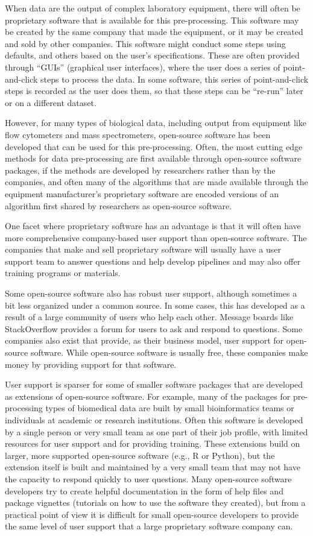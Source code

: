\documentclass[]{tufte-book}
\begin{document}
When data are the output of complex laboratory equipment, there will often be
proprietary software that is available for this pre-processing. This software
may be created by the same company that made the equipment, or it may be created
and sold by other companies. This software might conduct some steps using
defaults, and others based on the user's specifications. These are often
provided through ``GUIs'' (graphical user interfaces), where the user does a
series of point-and-click steps to process the data. In some software, this
series of point-and-click steps is recorded as the user does them, so that these
steps can be ``re-run'' later or on a different dataset.

However, for many types of biological data, including output from equipment like
flow cytometers and mass spectrometers, open-source software has been developed
that can be used for this pre-processing. Often, the most cutting edge methods
for data pre-processing are first available through open-source software
packages, if the methods are developed by researchers rather than by the
companies, and often many of the algorithms that are made available through the
equipment manufacturer's proprietary software are encoded versions of an
algorithm first shared by researchers as open-source software.

One facet where proprietary software has an advantage is that it will often have
more comprehensive company-based user support than open-source software. The
companies that make and sell proprietary software will usually have a user
support team to answer questions and help develop pipelines and may also offer
training programs or materials.

Some open-source software also has robust user support, although sometimes a bit
less organized under a common source. In some cases, this has developed as a
result of a large community of users who help each other. Message boards like
StackOverflow provides a forum for users to ask and respond to questions. Some
companies also exist that provide, as their business model, user support for
open-source software. While open-source software is usually free, these
companies make money by providing support for that software.

User support is sparser for some of smaller software packages that are developed
as extensions of open-source software. For example, many of the packages for
pre-processing types of biomedical data are built by small bioinformatics teams
or individuals at academic or research institutions. Often this software is
developed by a single person or very small team as one part of their job
profile, with limited resources for user support and for providing training.
These extensions build on larger, more supported open-source software (e.g., R
or Python), but the extension itself is built and maintained by a very small
team that may not have the capacity to respond quickly to user questions. Many
open-source software developers try to create helpful documentation in the form
of help files and package vignettes (tutorials on how to use the software they
created), but from a practical point of view it is difficult for small
open-source developers to provide the same level of user support that a large
proprietary software company can.
\end{document}
